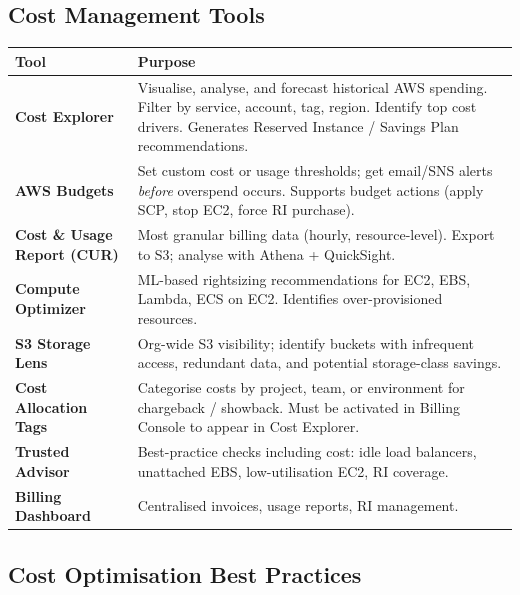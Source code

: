 \subsection{Cost Management Tools}

\begin{comparebox}[title={AWS cost management toolset}]
\begin{tabular}{@{}p{3.8cm}p{7.8cm}@{}}
\toprule
\textbf{Tool} & \textbf{Purpose} \\
\midrule
\textbf{Cost Explorer}       & Visualise, analyse, and forecast historical AWS spending.
                               Filter by service, account, tag, region. Identify top cost drivers.
                               Generates Reserved Instance / Savings Plan recommendations. \\[4pt]
\textbf{AWS Budgets}         & Set custom cost or usage thresholds; get email/SNS alerts
                               \emph{before} overspend occurs. Supports budget actions
                               (apply SCP, stop EC2, force RI purchase). \\[4pt]
\textbf{Cost \& Usage Report (CUR)} & Most granular billing data (hourly, resource-level).
                               Export to S3; analyse with Athena + QuickSight. \\[4pt]
\textbf{Compute Optimizer}   & ML-based rightsizing recommendations for EC2, EBS, Lambda,
                               ECS on EC2. Identifies over-provisioned resources. \\[4pt]
\textbf{S3 Storage Lens}     & Org-wide S3 visibility; identify buckets with infrequent access,
                               redundant data, and potential storage-class savings. \\[4pt]
\textbf{Cost Allocation Tags} & Categorise costs by project, team, or environment for chargeback /
                               showback. Must be activated in Billing Console to appear in Cost Explorer. \\[4pt]
\textbf{Trusted Advisor}     & Best-practice checks including cost: idle load balancers,
                               unattached EBS, low-utilisation EC2, RI coverage. \\[4pt]
\textbf{Billing Dashboard}   & Centralised invoices, usage reports, RI management. \\
\bottomrule
\end{tabular}
\end{comparebox}

\subsection{Cost Optimisation Best Practices}

